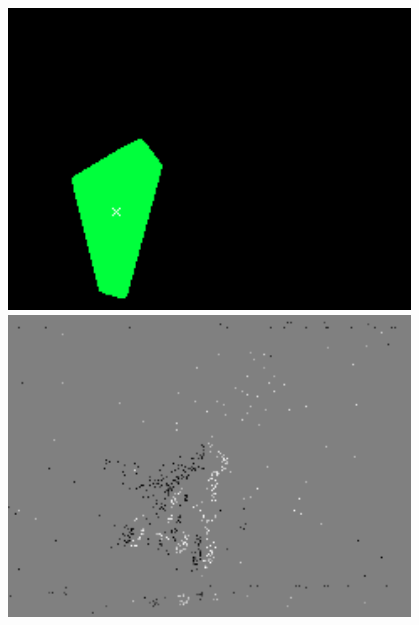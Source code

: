 \begin{figure}
\begin{minipage}{0.33\textwidth}
    \end{minipage}\hfill
    \begin{minipage}{0.33\textwidth}
        \centering
        \includegraphics[width = 0.95\textwidth]{images/obst_run2.png}
    \end{minipage}
        \begin{minipage}{0.33\textwidth}
        \centering
        \includegraphics[width = 0.95\textwidth]{images/unfiltered_run3.png}
    \end{minipage}\hfill
    \begin{minipage}{0.33\textwidth}
        \centering

\end{minipage}
\end{figure}
